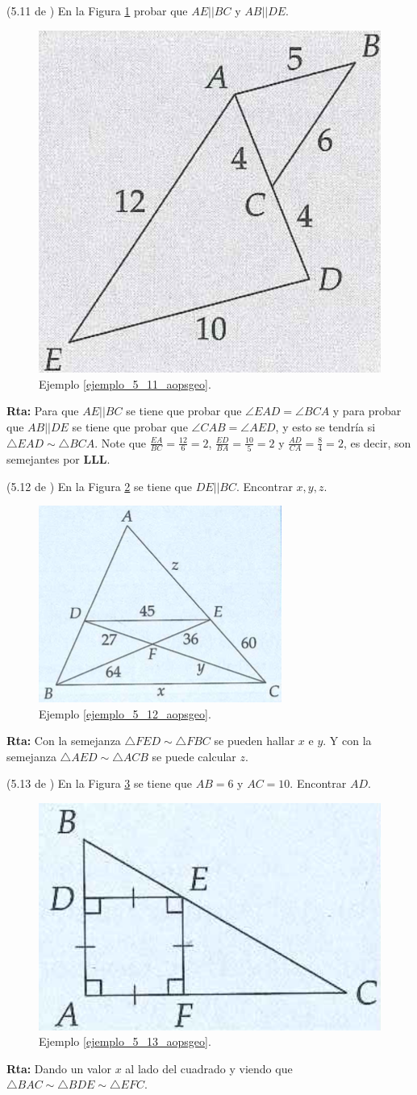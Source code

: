 \begin{ejemplo}{(5.11 de \cite{Aops_Geometria})}
\label{ejemplo_5_11_aopsgeo}En la Figura \ref{5_11_aopsgeo} probar que $AE||BC$ y $AB||DE$.
	\begin{figure}[H]
		\centering
		\includegraphics[width=0.3\linewidth]{Geometria/imgs/5_11_aopsgeo}
		\caption{Ejemplo \ref{ejemplo_5_11_aopsgeo}.}
		\label{5_11_aopsgeo}
	\end{figure}
		\textbf{Rta:} Para que $AE||BC$ se tiene que probar que $\angle EAD =\angle BCA$ y para probar que $AB||DE$ se tiene que probar que $\angle CAB =\angle AED$, y esto se tendría si $\triangle EAD \sim \triangle BCA$. Note que $\frac{EA}{BC}=\frac{12}{6}=2$, $\frac{ED}{BA}=\frac{10}{5}=2$ y $\frac{AD}{CA}=\frac{8}{4}=2$, es decir, son semejantes por \textbf{LLL}.
\end{ejemplo}


\begin{ejemplo}{(5.12 de \cite{Aops_Geometria})}
	\label{ejemplo_5_12_aopsgeo}En la Figura \ref{5_12_aopsgeo} se tiene que $DE||BC$. Encontrar $x,y,z$.
	\begin{figure}[H]
		\centering
		\includegraphics[width=0.3\linewidth]{Geometria/imgs/5_12_aopsgeo}
		\caption{Ejemplo \ref{ejemplo_5_12_aopsgeo}.}
		\label{5_12_aopsgeo}
	\end{figure}
		\textbf{Rta:} Con la semejanza $\triangle FED \sim \triangle FBC$ se pueden hallar $x$ e $y$. Y con la semejanza $\triangle AED \sim \triangle ACB$ se puede calcular $z$.
\end{ejemplo}

\begin{ejemplo}{(5.13 de \cite{Aops_Geometria})}
	\label{ejemplo_5_13_aopsgeo}En la Figura \ref{5_13_aopsgeo} se tiene que $AB=6$ y $AC=10$. Encontrar $AD$.
	\begin{figure}[H]
		\centering
		\includegraphics[width=0.3\linewidth]{Geometria/imgs/5_13_aopsgeo}
		\caption{Ejemplo \ref{ejemplo_5_13_aopsgeo}.}
		\label{5_13_aopsgeo}
	\end{figure}
	\textbf{Rta:} Dando un valor $x$ al lado del cuadrado y viendo que $\triangle BAC \sim \triangle BDE \sim \triangle EFC$.
\end{ejemplo}

